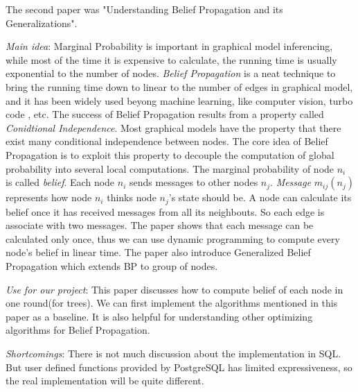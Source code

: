 The second paper was "Understanding Belief Propagation and its Generalizations".
\cite{bp}
\begin{itemize*}
\item {\em Main idea}: Marginal Probability is important in graphical model inferencing, while most of the time it is expensive to calculate, the running time is usually exponential to the number of nodes. \emph{Belief Propagation} is a neat technique to bring the running time down to linear to the number of edges in graphical model, and it has been widely used beyong machine learning, like computer vision\cite{felzenszwalb2006efficient}, turbo code 
\cite{mceliece1998turbo}, etc. The success of Belief Propagation results from a property called \emph{Conidtional Independence}. Most graphical models have the property that there exist many conditional independence between nodes. The core idea of Belief Propagation is to exploit this property to decouple the computation of global probability into several local computations. The marginal probability of node $n_{i}$ is called \emph{belief}. Each node $n_{i}$ sends messages to other nodes $n_{j}$. \emph{Message} $m_{ij}(n_{j})$ represents how node $n_{i}$ thinks node $n_{j}$'s state should be. A node can calculate its belief once it has received messages from all its neighbouts. So each edge is associate with two messages. The paper shows that each message can be calculated only once, thus we can use dynamic programming to compute every node's belief in linear time. The paper also introduce Generalized Belief Propagation which extends BP to group of nodes.
\item {\em Use for our project}:
      This paper discusses how to compute belief of each node in one round(for trees). We can first implement the algorithms mentioned in this paper as a baseline. It is also helpful for understanding other optimizing algorithms for Belief Propagation. 
\item {\em Shortcomings}:
       There is not much discussion about the implementation in SQL. But user defined functions provided by PostgreSQL has limited expressiveness, so the real implementation will be quite different.
\end{itemize*}


